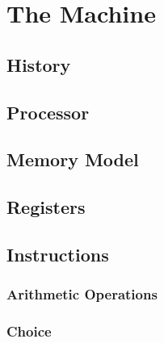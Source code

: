 \chapter{The Machine}
\label{sec:machine}

\section{History}







\section{Processor}

\section{Memory Model}

\section{Registers}

\section{Instructions}

\subsection{Arithmetic Operations}

\subsection{Choice}

